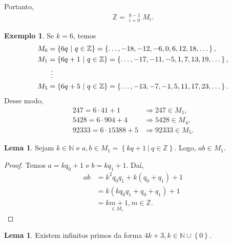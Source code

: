 \documentclass[a4paper,11pt,twoside, leqno]{article}
\theoremstyle{definition}
\newtheorem{lemma}[theorem]{Lema}
\newtheorem*{example}{Exemplo}
\begin{document}
Portanto, 
\begin{align*}
\mathbb{Z} = \mathop{\dot\bigcup}_{i=0}^{k-1}M_i.
\end{align*}
\begin{example}
	Se $k=6$, temos
	\begin{align*}
	M_0 &= \left\{ 6q \ | \ q\in\mathbb{Z} \right\} = \left\{ \dots, -18, -12, -6, 0, 6, 12, 18, \dots \right\}, \\
	M_1 &= \left\{ 6q + 1 \ | \ q\in\mathbb{Z} \right\} = \left\{ \dots, -17, -11, -5, 1, 7, 13, 19, \dots \right\}, \\
	&\hspace{0.15cm}\vdots \\
	M_5 &= \left\{ 6q + 5\ | \ q\in\mathbb{Z} \right\} = \left\{ \dots, -13, -7, -1, 5, 11, 17, 23, \dots \right\}.
	\end{align*}
	Desse modo,
	\begin{align*}
	247 = 6\cdot 41 + 1 &\Longrightarrow 247 \in M_1, \\
	5428 = 6\cdot 904 + 4 &\Longrightarrow 5428 \in M_4, \\
	92333 = 6\cdot 15388 + 5 &\Longrightarrow 92333 \in M_5.
	\end{align*}
\end{example}
\begin{lemma}
	\label{lema 20}
	Sejam $k\in\mathbb{N}$ e $a,b\in M_1 = \left\{ kq + 1 \ | \ q\in\mathbb{Z} \right\}$. Logo, $ab\in M_1$.
\end{lemma}
\begin{proof}
	Temos $a = kq_0 + 1$ e $b = kq_1 + 1$. Daí,
	\begin{align*}
	ab &= k^2q_0q_1 + k(q_0 + q_1) + 1 \\
	&= k(kq_0q_1 + q_0 + q_1) + 1\\
	&= \underset{\in M_1}{km + 1}, m\in\mathbb{Z}.
	\end{align*}
\end{proof}
\begin{lemma}
	\label{lema 21}
	Existem infinitos primos da forma $4k+3, k\in\mathbb{N}\cup\left\{0\right\}$.
\end{lemma}
\end{document}
